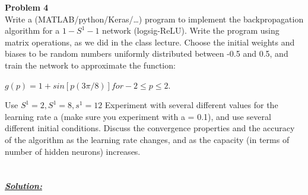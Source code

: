 \documentclass{article}
\begin{document}
\newpage
\noindent \textbf{Problem 4} \\

\noindent Write a (MATLAB/python/Keras/…) program to implement the backpropagation
algorithm for a $1-S^1-1$ network (logsig-ReLU). Write the program using matrix
operations, as we did in the class lecture. Choose the initial weights and biases to be
random numbers uniformly distributed between -0.5 and 0.5, and train the network to
approximate the function:
\begin{center}
  $ g(p)=1+sin[p(3 \pi /8)] for -2 \leq p \leq 2.$
\end{center}

\noindent Use $S^1=2, S^1=8, s^1=12$  Experiment with several different values for the learning
rate a (make sure you experiment with a = 0.1), and use several different initial conditions.
Discuss the convergence properties and the accuracy of the algorithm as the learning rate
changes, and as the capacity (in terms of number of hidden neurons) increases. \\ \\ \\

\noindent \underline{\textbf{\textit{Solution:}}} \\ 
\end{document}
